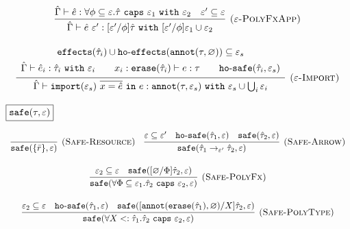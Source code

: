 \documentclass{llncs}
\newcommand{\keywadj}[1]{\mathtt{#1}}
\newcommand{\keyw}[1]{\keywadj{#1}~}
\newcommand{\kw}[1]{\keyw{ #1 }}
\newcommand{\kwa}[1]{\keywadj{ #1 }}
\newcommand{\hyphen}{\hbox{-}}
\newcommand{\hofx}[1]{ \kwa{ho \hyphen effects}(#1) }
\newcommand{\safe}[2]{ \kwa{safe}(#1, #2) }
\newcommand{\hosafe}[2]{ \kwa{ho \hyphen safe}(#1, #2) }
\newcommand{\annot}[2]{
	\keywadj{annot}(#1, #2)
}
\newcommand{\erase}[1]{
	\keywadj{erase}(#1)
}
\newcommand{\polycap}[3]{
	\forall #1. #2~ \kw{caps} #3
}
\begin{document}
\[\begin{array}{c}
\infer[\textsc{($\varepsilon$-PolyFxApp)}]
	{ \hat \Gamma \vdash \hat e~\varepsilon' : [\varepsilon'/\phi]\hat \tau~\kw{with} [\varepsilon'/\phi]\varepsilon_1 \cup \varepsilon_2 }
	{ \hat \Gamma \vdash \hat e: \polycap{\phi \subseteq \varepsilon}{\hat \tau}{\varepsilon_1}~\kw{with} \varepsilon_2 & \varepsilon' \subseteq \varepsilon } \\[2ex]

\infer[\textsc{($\varepsilon$-Import)}]
	{ \hat \Gamma \vdash \kwa{import}(\varepsilon_s)~\overline{x = \hat e}~\kw{in} e: \kwa{annot}(\tau, \varepsilon_s)~\kw{with} \varepsilon_s \cup \bigcup_{i} \varepsilon_i }
{{\def\arraystretch{1.4}
  \begin{array}{c}
\kwa{effects}(\hat \tau_i) \cup \hofx{\annot{\tau}{\varnothing}}\subseteq \varepsilon_s \\
\hat \Gamma \vdash \hat e_i: \hat \tau_i~\kw{with} \varepsilon_i  ~~~~~~ x_i: \kwa{erase}(\hat \tau_i) \vdash e: \tau ~~~~~~ \hosafe{\hat \tau_i}{\varepsilon_s}
  \end{array}}} 
 
 
\end{array}
\]





\noindent
$\fbox{$\kwa{safe(\tau, \varepsilon)}$}$

\[
\begin{array}{c}

\infer[\textsc{(Safe-Resource)}]
	{\kwa{safe}(\{ \bar r \}, \varepsilon)}
	{}
~~~
\infer[\textsc{(Safe-Arrow)}]
	{\kwa{safe}(\hat \tau_1 \rightarrow_{\varepsilon'} \hat \tau_2, \varepsilon)}
	{\varepsilon \subseteq \varepsilon' & \kwa{ho \hyphen safe}(\hat \tau_1, \varepsilon) & \kwa{safe}(\hat \tau_2, \varepsilon)} \\[3ex]

\infer[\textsc{(Safe-PolyFx)}]
	{\safe{\forall \Phi \subseteq \varepsilon_1. \hat \tau_2~\kw{caps} \varepsilon_2}{\varepsilon} }
	{\varepsilon_2 \subseteq \varepsilon & \safe{[\varnothing/\Phi]\hat \tau_2}{\varepsilon}} \\[3ex]

\infer[\textsc{(Safe-PolyType)}]
	{\safe{\polycap{X <: \hat \tau_1}{\hat \tau_2}{\varepsilon_2}}{\varepsilon}}
	{\varepsilon_2 \subseteq \varepsilon & \hosafe{\hat \tau_1}{\varepsilon} & \safe{[\annot{\erase{\hat \tau_1}}{\varnothing}/X]\hat \tau_2}{\varepsilon}}

\end{array}
\]
\end{document}
